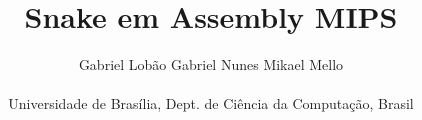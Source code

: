 \documentclass[a4paper]{sbgames}
\begin{document}
\title{Snake em Assembly MIPS}



 \author{ Gabriel Lobão 
         \hspace{28pt} Gabriel Nunes \hspace{28pt} Mikael Mello\\
         \vspace{0pt} \\
         {Universidade de Brasília, Dept. de Ciência da Computação, Brasil} }
        





\maketitle
\end{document}
